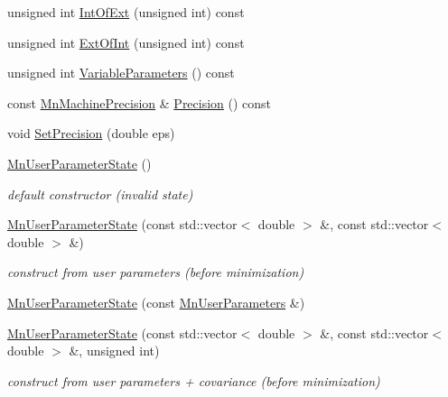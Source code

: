 \begin{DoxyCompactItemize}
\item 
unsigned int \mbox{\hyperlink{classROOT_1_1Minuit2_1_1MnUserParameterState_ab07f3ff917c70471b327243764aaad83}{Int\+Of\+Ext}} (unsigned int) const
\item 
unsigned int \mbox{\hyperlink{classROOT_1_1Minuit2_1_1MnUserParameterState_a9ab7bee2faaac9a607d090eb11926150}{Ext\+Of\+Int}} (unsigned int) const
\item 
unsigned int \mbox{\hyperlink{classROOT_1_1Minuit2_1_1MnUserParameterState_a8226cef71821d2558f31570f002631a4}{Variable\+Parameters}} () const
\item 
const \mbox{\hyperlink{classROOT_1_1Minuit2_1_1MnMachinePrecision}{Mn\+Machine\+Precision}} \& \mbox{\hyperlink{classROOT_1_1Minuit2_1_1MnUserParameterState_a03f90db04e5573afaef3865d0d87b85b}{Precision}} () const
\item 
void \mbox{\hyperlink{classROOT_1_1Minuit2_1_1MnUserParameterState_aab7787768e533471839387ef51a75cbb}{Set\+Precision}} (double eps)
\item 
\mbox{\hyperlink{classROOT_1_1Minuit2_1_1MnUserParameterState_aa327732c14a8771b3ae0cb5a67bba9f7}{Mn\+User\+Parameter\+State}} ()
\begin{DoxyCompactList}\small\item\em default constructor (invalid state) \end{DoxyCompactList}\item 
\mbox{\hyperlink{classROOT_1_1Minuit2_1_1MnUserParameterState_a75f83d5752afc69f1e55838f8446880a}{Mn\+User\+Parameter\+State}} (const std\+::vector$<$ double $>$ \&, const std\+::vector$<$ double $>$ \&)
\begin{DoxyCompactList}\small\item\em construct from user parameters (before minimization) \end{DoxyCompactList}\item 
\mbox{\hyperlink{classROOT_1_1Minuit2_1_1MnUserParameterState_aa4a32c2e51a89c2feca7a376972f1ff5}{Mn\+User\+Parameter\+State}} (const \mbox{\hyperlink{classROOT_1_1Minuit2_1_1MnUserParameters}{Mn\+User\+Parameters}} \&)
\item 
\mbox{\hyperlink{classROOT_1_1Minuit2_1_1MnUserParameterState_a146a0e2f845431830d795b919bb8f594}{Mn\+User\+Parameter\+State}} (const std\+::vector$<$ double $>$ \&, const std\+::vector$<$ double $>$ \&, unsigned int)
\begin{DoxyCompactList}\small\item\em construct from user parameters + covariance (before minimization) \end{DoxyCompactList}\item 

\end{DoxyCompactItemize}
